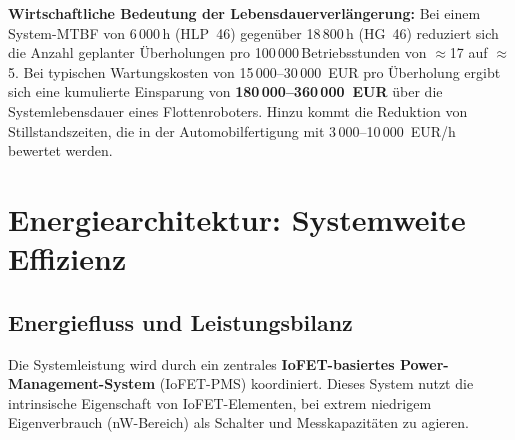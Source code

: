 ﻿\documentclass[a4paper,12pt]{scrreprt}
\theoremstyle{definition}
\begin{document}
\begin{infobox}
\textbf{Wirtschaftliche Bedeutung der Lebensdauerverlängerung:}
Bei einem System-MTBF von 6\,000\,h (HLP~46) gegenüber 18\,800\,h (HG~46)
reduziert sich die Anzahl geplanter Überholungen pro 100\,000\,Betriebs\-stunden
von $\approx$17 auf $\approx$5. Bei typischen Wartungskosten von
15\,000--30\,000~EUR pro Überholung ergibt sich eine kumulierte Einsparung
von \textbf{180\,000--360\,000~EUR} über die Systemlebensdauer
eines Flottenroboters. Hinzu kommt die Reduktion von Stillstandszeiten,
die in der Automobilfertigung mit 3\,000--10\,000~EUR/h bewertet werden.
\end{infobox}

\section{Energiearchitektur: Systemweite Effizienz}

\subsection{Energiefluss und Leistungsbilanz}

Die Systemleistung wird durch ein zentrales \textbf{IoFET-basiertes
Power-Management-System} (IoFET-PMS) koordiniert. Dieses System
nutzt die intrinsische Eigenschaft von IoFET-Elementen, bei extrem
niedrigem Eigenverbrauch (\si{\nano\watt}-Bereich) als Schalter und
Messkapazitäten zu agieren.
\end{document}
